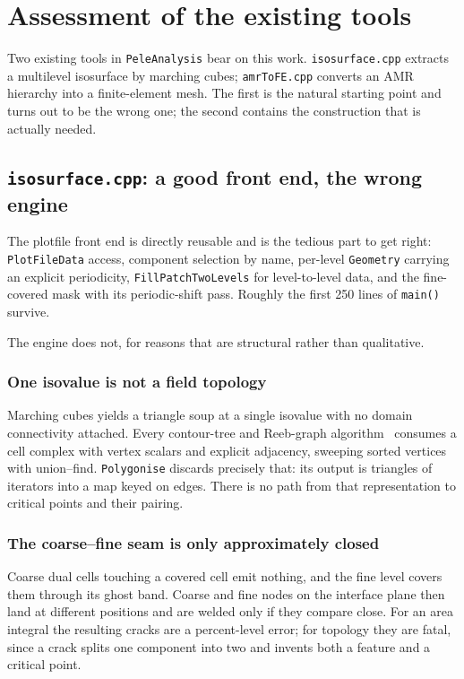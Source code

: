 \chapter{Assessment of the existing tools}
\label{ch:assessment}

Two existing tools in \texttt{PeleAnalysis} bear on this work.
\texttt{isosurface.cpp} extracts a multilevel isosurface by marching cubes;
\texttt{amrToFE.cpp} converts an AMR hierarchy into a finite-element mesh. The
first is the natural starting point and turns out to be the wrong one; the
second contains the construction that is actually needed.

\section{\texttt{isosurface.cpp}: a good front end, the wrong engine}

The plotfile front end is directly reusable and is the tedious part to get
right: \texttt{PlotFileData} access, component selection by name, per-level
\texttt{Geometry} carrying an explicit periodicity, \texttt{FillPatchTwoLevels}
for level-to-level data, and the fine-covered mask with its periodic-shift
pass. Roughly the first 250 lines of \texttt{main()} survive.

The engine does not, for reasons that are structural rather than qualitative.

\subsection{One isovalue is not a field topology}

Marching cubes yields a triangle soup at a single isovalue with no domain
connectivity attached. Every contour-tree and Reeb-graph
algorithm~\cite{carr2003contourtree,tierny2009loopsurgery,gueunet2016contourforests}
consumes a cell complex with vertex scalars and explicit adjacency, sweeping
sorted vertices with union--find. \texttt{Polygonise} discards precisely that:
its output is triangles of iterators into a map keyed on edges. There is no
path from that representation to critical points and their pairing.

\subsection{The coarse--fine seam is only approximately closed}

Coarse dual cells touching a covered cell emit nothing, and the fine level
covers them through its ghost band. Coarse and fine nodes on the interface
plane then land at different positions and are welded only if they compare
close. For an area integral the resulting cracks are a percent-level error; for
topology they are fatal, since a crack splits one component into two and
invents both a feature and a critical point.

